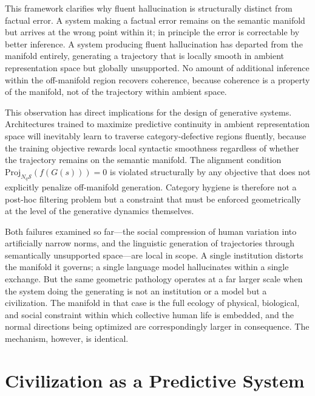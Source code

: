 \documentclass[11pt,a4paper,twocolumn]{article}
\begin{document}
This framework clarifies why fluent hallucination is structurally
distinct from factual error. A system making a factual error
remains on the semantic manifold but arrives at the wrong point
within it; in principle the error is correctable by better
inference. A system producing fluent hallucination has departed
from the manifold entirely, generating a trajectory that is
locally smooth in ambient representation space but globally
unsupported. No amount of additional inference within the
off-manifold region recovers coherence, because coherence is a
property of the manifold, not of the trajectory within ambient
space.

This observation has direct implications for the design of
generative systems. Architectures trained to maximize predictive
continuity in ambient representation space will inevitably learn
to traverse category-defective regions fluently, because the
training objective rewards local syntactic smoothness regardless
of whether the trajectory remains on the semantic manifold. The
alignment condition $\mathrm{Proj}_{N_q \mathcal{S}}(f(G(s))) = 0$
is violated structurally by any objective that does not
explicitly penalize off-manifold generation. Category hygiene
is therefore not a post-hoc filtering problem but a constraint
that must be enforced geometrically at the level of the
generative dynamics themselves.

Both failures examined so far---the social compression of human
variation into artificially narrow norms, and the linguistic
generation of trajectories through semantically unsupported
space---are local in scope. A single institution distorts the
manifold it governs; a single language model hallucinates
within a single exchange. But the same geometric pathology
operates at a far larger scale when the system doing the
generating is not an institution or a model but a civilization.
The manifold in that case is the full ecology of physical,
biological, and social constraint within which collective
human life is embedded, and the normal directions being
optimized are correspondingly larger in consequence. The
mechanism, however, is identical.


\section{Civilization as a Predictive System}
\end{document}
